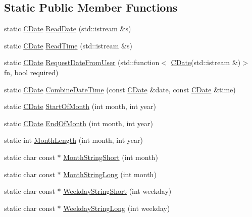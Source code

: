 \subsection*{Static Public Member Functions}
\begin{DoxyCompactItemize}
\item 
static \mbox{\hyperlink{class_c_date}{C\+Date}} \mbox{\hyperlink{class_c_date_acecb85381be6fa61d1416b52b506d023}{Read\+Date}} (std\+::istream \&s)
\item 
static \mbox{\hyperlink{class_c_date}{C\+Date}} \mbox{\hyperlink{class_c_date_a73bd9b45b74115d1557f1729f996e16a}{Read\+Time}} (std\+::istream \&s)
\item 
static \mbox{\hyperlink{class_c_date}{C\+Date}} \mbox{\hyperlink{class_c_date_ae3fb0fe31274b4485ff17a167bbfc508}{Request\+Date\+From\+User}} (std\+::function$<$ \mbox{\hyperlink{class_c_date}{C\+Date}}(std\+::istream \&)$>$ fn, bool required)
\item 
static \mbox{\hyperlink{class_c_date}{C\+Date}} \mbox{\hyperlink{class_c_date_a28c167be273e16b93c80f5d59bd70dd9}{Combine\+Date\+Time}} (const \mbox{\hyperlink{class_c_date}{C\+Date}} \&date, const \mbox{\hyperlink{class_c_date}{C\+Date}} \&time)
\item 
static \mbox{\hyperlink{class_c_date}{C\+Date}} \mbox{\hyperlink{class_c_date_a099ad9550e267ef4335138e3bb4729d8}{Start\+Of\+Month}} (int month, int year)
\item 
static \mbox{\hyperlink{class_c_date}{C\+Date}} \mbox{\hyperlink{class_c_date_ae4943e159d1375cf8e90474131d821a2}{End\+Of\+Month}} (int month, int year)
\item 
static int \mbox{\hyperlink{class_c_date_a5cba42ef155816c8d374d50e8149800d}{Month\+Length}} (int month, int year)
\item 
static char const  $\ast$ \mbox{\hyperlink{class_c_date_a4dc10a16bb273faf61c896c71f3f50de}{Month\+String\+Short}} (int month)
\item 
static char const  $\ast$ \mbox{\hyperlink{class_c_date_ae5b1a9098f964ba2243e6dd542f43891}{Month\+String\+Long}} (int month)
\item 
static char const  $\ast$ \mbox{\hyperlink{class_c_date_aff31350db373c3483a62b67f7467b578}{Weekday\+String\+Short}} (int weekday)
\item 
static char const  $\ast$ \mbox{\hyperlink{class_c_date_ad1fa158c041d965a156f8c0e26ff5cea}{Weekday\+String\+Long}} (int weekday)
\end{DoxyCompactItemize}
